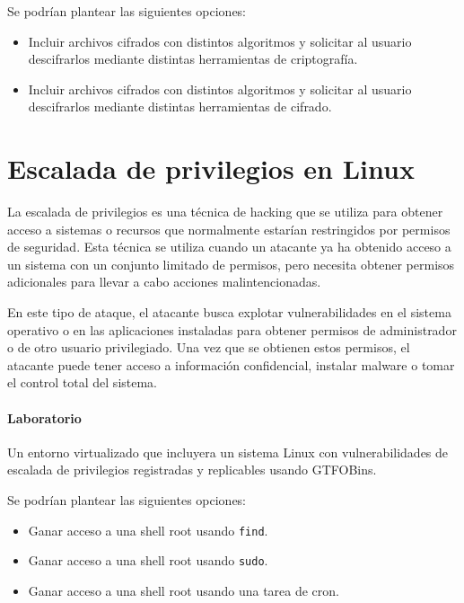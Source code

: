             Se podrían plantear las siguientes opciones:
            
            \begin{itemize}
                \item Incluir archivos cifrados con distintos algoritmos y solicitar al usuario descifrarlos mediante distintas herramientas de criptografía.
                \item Incluir archivos cifrados con distintos algoritmos y solicitar al usuario descifrarlos mediante distintas herramientas de cifrado.
            \end{itemize}

    
    \section{Escalada de privilegios en Linux}

        La escalada de privilegios es una técnica de hacking que se utiliza para obtener acceso a sistemas o recursos que normalmente estarían restringidos por permisos de seguridad. Esta técnica se utiliza cuando un atacante ya ha obtenido acceso a un sistema con un conjunto limitado de permisos, pero necesita obtener permisos adicionales para llevar a cabo acciones malintencionadas.
            
        En este tipo de ataque, el atacante busca explotar vulnerabilidades en el sistema operativo o en las aplicaciones instaladas para obtener permisos de administrador o de otro usuario privilegiado. Una vez que se obtienen estos permisos, el atacante puede tener acceso a información confidencial, instalar malware o tomar el control total del sistema.

        \paragraph{Laboratorio}

            Un entorno virtualizado que incluyera un sistema Linux con vulnerabilidades de escalada de privilegios registradas y replicables usando GTFOBins.

            Se podrían plantear las siguientes opciones:
            
            \begin{itemize}
                \item Ganar acceso a una shell root usando \texttt{find}.
                \item Ganar acceso a una shell root usando \texttt{sudo}.
                \item Ganar acceso a una shell root usando una tarea de cron.
            \end{itemize}

